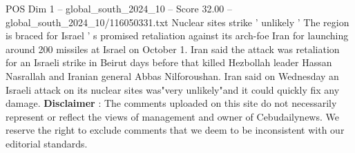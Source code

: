 \begin{textsample}{POS Dim 1 – global\_south\_2024\_10 – Score 32.00 – global\_south\_2024\_10/116050331.txt}
Nuclear sites strike ' unlikely ' The region is braced for Israel ' s promised retaliation against its arch-foe Iran for launching around 200 missiles at Israel on October 1.
Iran said the attack was retaliation for an Israeli strike in Beirut days before that killed Hezbollah leader Hassan Nasrallah and Iranian general Abbas Nilforoushan.
Iran said on Wednesday an Israeli attack on its nuclear sites was"very unlikely"and it could quickly fix any damage. \textbf{Disclaimer} : The comments uploaded on this site do not necessarily represent or reflect the views of management and owner of Cebudailynews.
We reserve the right to exclude comments that we deem to be inconsistent with our editorial standards.

\end{textsample}
